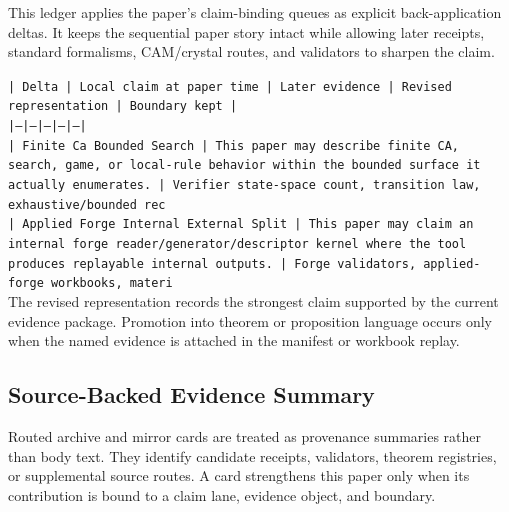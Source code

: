 \documentclass[11pt]{article}
\begin{document}
This ledger applies the paper's claim-binding queues as explicit back-application
deltas. It keeps the sequential paper story intact while allowing later
receipts, standard formalisms, CAM/crystal routes, and validators to sharpen the
claim.

\noindent\texttt{| Delta | Local claim at paper time | Later evidence | Revised representation | Boundary kept |}\\
\noindent\texttt{|---|---|---|---|---|}\\
\noindent\texttt{| Finite Ca Bounded Search | This paper may describe finite CA, search, game, or local-rule behavior within the bounded surface it actually enumerates. | Verifier state-space count, transition law, exhaustive/bounded rec}\\
\noindent\texttt{| Applied Forge Internal External Split | This paper may claim an internal forge reader/generator/descriptor kernel where the tool produces replayable internal outputs. | Forge validators, applied-forge workbooks, materi}\\

The revised representation records the strongest claim supported by the current evidence package. Promotion into theorem or proposition language occurs only when the named evidence is attached in the manifest or workbook replay.

\subsection*{Source-Backed Evidence Summary}

Routed archive and mirror cards are treated as provenance summaries rather than
body text. They identify candidate receipts, validators, theorem registries, or
supplemental source routes. A card strengthens this paper only when its
contribution is bound to a claim lane, evidence object, and boundary.
\end{document}
